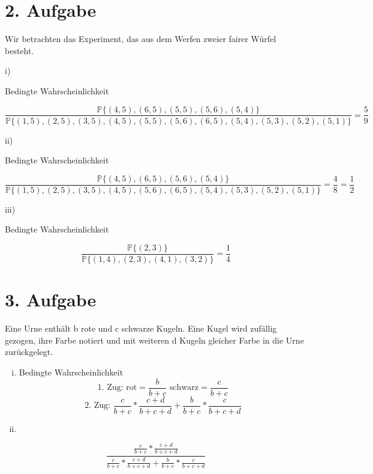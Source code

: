 \documentclass[10pt,a4paper,parskip=half]{scrartcl}
\begin{document}
\section*{2. Aufgabe}
Wir betrachten das Experiment, das aus dem Werfen zweier fairer Würfel besteht.
\begin{flushleft}
\item[i)]
\begin{description}
Bedingte Wahrscheinlichkeit
\end{description}
\end{flushleft}
\begin{displaymath}
  \frac{ \mathbb{P} \{(4,5),(6,5),(5,5),(5,6),(5,4)\}}{\mathbb{P} \{(1,5),(2,5),(3,5),(4,5),(5,5),(5,6),(6,5),(5,4),(5,3),(5,2),(5,1)\}} = \frac{5}{9}
\end{displaymath}
\begin{flushleft}
\item[ii)]
\begin{description}
Bedingte Wahrscheinlichkeit
\end{description}
\end{flushleft}
\begin{displaymath}
	\frac{ \mathbb{P} \{(4,5),(6,5),(5,6),(5,4)\}}{\mathbb{P} \{(1,5),(2,5),(3,5),(4,5),(5,6),(6,5),(5,4),(5,3),(5,2),(5,1)\}} = \frac{4}{8} = \frac{1}{2}
\end{displaymath}
\begin{flushleft}
\item[iii)]
\begin{description}
Bedingte Wahrscheinlichkeit
\end{description}
\end{flushleft}
\begin{displaymath}
	\frac{ \mathbb{P} \{(2,3)\}}{\mathbb{P} \{(1,4),(2,3),(4,1),(3,2)\}} = \frac{1}{4}
\end{displaymath}

\section*{3. Aufgabe}
Eine Urne enthält b rote und c schwarze Kugeln. Eine Kugel wird zufällig gezogen, ihre
Farbe notiert und mit weiteren d Kugeln gleicher Farbe in die Urne zurückgelegt.
\begin{enumerate}[i)]
\item
Bedingte Wahrscheinlichkeit
$$
\text{1. Zug: rot} = \frac{b}{b+c} \text{ schwarz} = \frac{c}{b+c}
$$
$$
\text{2. Zug: }\frac{c}{b+c} * \frac{c+d}{b+c+d} + \frac{b}{b+c} * \frac{c}{b+c+d}
$$
\item
\end{enumerate}
$$
\frac{\frac{c}{b+c} * \frac{c+d}{b+c+d}}{\frac{c}{b+c} * \frac{c+d}{b+c+d} + \frac{b}{b+c} * \frac{c}{b+c+d}}
$$
\end{document}
